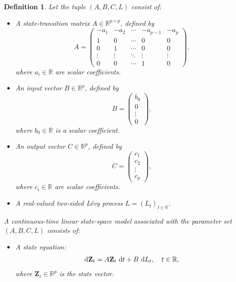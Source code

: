\documentclass[10pt,a4paper,reqno]{amsart}
\newtheorem{definition}[theorem]{Definition}
\theoremstyle{example}
\newcommand*\D{\mathop{}\!\textnormal{d}}
\begin{document}
\begin{definition}\label{def:state-space-model}
Let the tuple $(A, B, C, L)$ consist of:

\begin{itemize}
    \item A \emph{state-transition matrix} $A \in \mathbb{R}^{p \times p}$, defined by
    \[
    A = \begin{pmatrix}
    -a_1 & -a_2 & \cdots & -a_{p-1} & -a_p \\
    1 & 0 & \cdots & 0 & 0 \\
    0 & 1 & \cdots & 0 & 0 \\
    \vdots & \vdots & \ddots & \vdots & \vdots \\
    0 & 0 & \cdots & 1 & 0
    \end{pmatrix},
    \]
    where $a_i \in \mathbb{R}$ are scalar coefficients.

    \item An \emph{input vector} $B \in \mathbb{R}^{p}$, defined by
    \[
    B = \begin{pmatrix}
    b_0 \\
    0 \\
    \vdots \\
    0
    \end{pmatrix},
    \]
    where $b_0 \in \mathbb{R}$ is a scalar coefficient.

    \item An \emph{output vector} $C \in \mathbb{R}^{p}$, defined by
    \[
    C = \begin{pmatrix}
    c_1 \\
    c_2 \\
    \vdots \\
    c_p
    \end{pmatrix},
    \]
    where $c_i \in \mathbb{R}$ are scalar coefficients.

    \item A real-valued two-sided L\'evy process $L = (L_t)_{t \in \mathbb{R}}$.
\end{itemize}

A \emph{continuous-time linear state-space model} associated with the parameter set $(A, B, C, L)$ consists of:

\begin{itemize}
    \item A \emph{state equation}:
    \begin{align}\label{eq:state-space}
    \D \mathbf{Z}_t = A \mathbf{Z}_t \, \D t + B \, \D L_t, \quad t \in \mathbb{R},
    \end{align}
    where $\mathbf{Z}_t \in \mathbb{R}^{p}$ is the state vector.


\end{itemize}
\end{definition}
\end{document}
